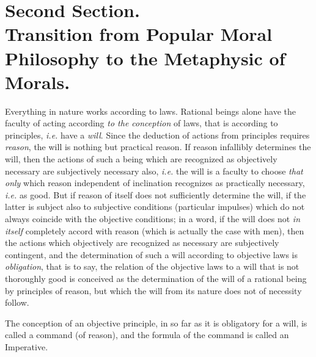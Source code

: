 \section{Second Section.\\\smaller Transition from Popular Moral
Philosophy to the Metaphysic of Morals.}


Everything in nature works according to laws. Rational beings
alone have the faculty of acting according \textit{to the conception}
of laws, that is according to principles, \textit{i.e.} have a
\textit{will}. Since the deduction of actions from principles requires
\textit{reason}, the will is nothing but practical reason. If reason
infallibly determines the will, then the actions of such a being which
are recognized as objectively necessary are subjectively necessary
also, \textit{i.e.} the will is a faculty to choose \textit{that only}
which reason independent of inclination recognizes as practically
necessary, \textit{i.e.} as good. But if reason of itself does not
sufficiently determine the will, if the latter is subject also to
subjective conditions (particular impulses) which do not always
coincide with the objective conditions; in a word, if the will does
not \textit{in itself} completely accord with reason (which is
actually the case with men), then the actions which objectively are
recognized as necessary are subjectively contingent, and the
determination of  such a will according to objective laws is
\textit{obligation}, that is to say, the relation of the objective
laws to a will that is not thoroughly good is conceived as the
determination of the will of a rational being by principles of reason,
but which the will from its nature does not of necessity follow.

The conception of an objective principle, in so far as it is
obligatory for a will, is called a command (of reason), and the
formula of the command is called an Imperative.

